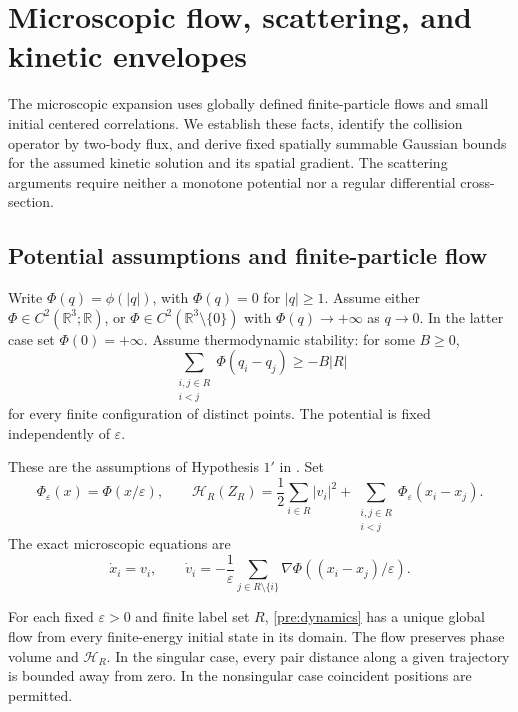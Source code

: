 \section{Microscopic flow, scattering, and kinetic envelopes}
\label{sec:preliminaries}

The microscopic expansion uses globally defined finite-particle flows
and small initial centered correlations. We establish these facts,
identify the collision operator by two-body flux, and derive fixed
spatially summable Gaussian bounds for the assumed kinetic solution
and its spatial gradient. The scattering arguments require neither a
monotone potential nor a regular differential cross-section.

\subsection{Potential assumptions and finite-particle flow}

\begin{assumption}\label{pre:potential}
Write $\Phi(q)=\phi(|q|)$, with $\Phi(q)=0$ for $|q|\geq1$.
Assume either $\Phi\in C^2(\mathbb R^3;\mathbb R)$, or
$\Phi\in C^2(\mathbb R^3\setminus\{0\})$ with
$\Phi(q)\to+\infty$ as $q\to0$.
In the latter case set $\Phi(0)=+\infty$.
Assume thermodynamic stability: for some $B\geq0$,
\begin{equation}\label{eq:pre-stability}
 \sum_{\substack{i,j\in R\\i<j}}\Phi(q_i-q_j)\geq-B|R|
\end{equation}
for every finite configuration of distinct points.
The potential is fixed independently of $\varepsilon$.
\end{assumption}

These are the assumptions of Hypothesis $1'$ in
\cite[Section 8]{PSS14}. Set
\[
 \Phi_\varepsilon(x)=\Phi(x/\varepsilon),\qquad
 \mathscr H_R(Z_R)=\frac12\sum_{i\in R}|v_i|^2+
       \sum_{\substack{i,j\in R\\i<j}}\Phi_\varepsilon(x_i-x_j).
\]
The exact microscopic equations are
\begin{equation}\label{pre:dynamics}
 \dot x_i=v_i,\qquad
 \dot v_i=-\frac1\varepsilon\sum_{j\in R\setminus\{i\}}
             \nabla\Phi((x_i-x_j)/\varepsilon).
\end{equation}

\begin{proposition}\label{pre:flow}
For each fixed $\varepsilon>0$ and finite label set $R$,
\eqref{pre:dynamics} has a unique global flow from every finite-energy
initial state in its domain. The flow preserves phase volume and
$\mathscr H_R$. In the singular case, every pair distance along a given
trajectory is bounded away from zero. In the nonsingular case coincident
positions are permitted.
\end{proposition}

